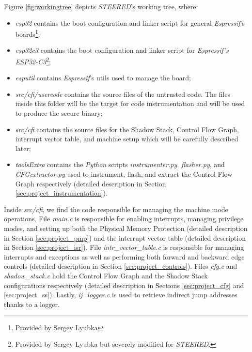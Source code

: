 Figure \ref{fig:workingtree} depicts \textit{STEERED}'s working tree, where:

\begin{itemize}
  \item \textit{esp32} contains the boot configuration and linker script for
    general \textit{Espressif}'s boards\footnote{Provided by Sergey Lyubka};

  \item \textit{esp32c3} contains the boot configuration and linker script for
    \textit{Espressif's ESP32-C3}\footnote{Provided by Sergey Lyubka but
    severely modified for \textit{STEERED}.};

  \item \textit{esputil} contains \textit{Espressif}'s utils used to manage the board;

  \item \textit{src/cfi/usercode} contains the source files of the untrusted
    code. The files inside this folder will be the target for code instrumentation
    and will be used to produce the secure binary;

  \item \textit{src/cfi} contains the source files for the Shadow Stack, Control
    Flow Graph, interrupt vector table, and machine setup which will be carefully
    described later;

  \item \textit{toolsExtra} contains the \textit{Python} scripts \textit{instrumenter.py},
    \textit{flasher.py}, and \textit{CFGextractor.py} used to instrument, flash,
    and extract the Control Flow Graph respectively (detailed description in Section
    \ref{sec:project_instrumentation}).
\end{itemize}

Inside \textit{src/cfi}, we find the code responsible for managing the machine mode
operations. File \textit{main.c} is responsible for enabling interrupts,
managing privilege modes, and setting up both the Physical Memory Protection (detailed
description in Section \ref{sec:project_pmp}) and the interrupt vector table (detailed
description in Section \ref{sec:project_isr}). File \textit{intr\_vector\_table.c}
is responsible for managing interrupts and exceptions as well as performing both
forward and backward edge controls (detailed description in Section
\ref{sec:project_controls}). Files \textit{cfg.c} and \textit{shadow\_stack.c}
hold the Control Flow Graph and the Shadow Stack configurations respectively (detailed
description in Sections \ref{sec:project_cfg} and \ref{sec:project_ss}). Lastly,
\textit{ij\_logger.c} is used to retrieve indirect jump addresses thanks to a logger.


